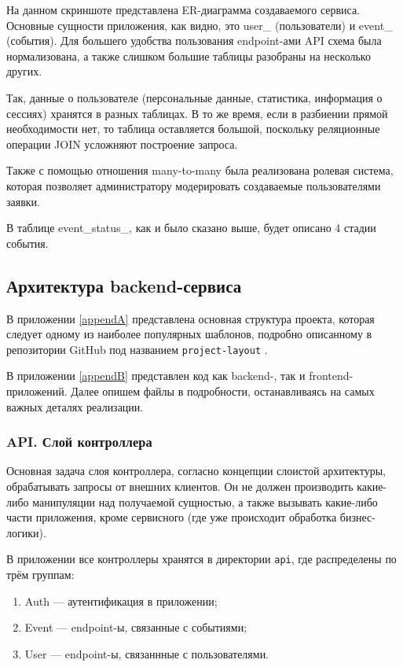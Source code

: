 \documentclass[diploma]{SCWorks}
\begin{document}
На данном скриншоте представлена ER-диаграмма создаваемого сервиса. Основные
сущности приложения, как видно, это user\_ (пользователи) и event\_ (события). 
Для большего удобства пользования endpoint-ами API схема была 
нормализована, а также слишком большие таблицы разобраны на несколько других.

Так, данные о пользователе (персональные данные, статистика, информация о 
сессиях) хранятся в разных таблицах. В то же время, если в разбиении 
прямой необходимости нет, то таблица оставляется
большой, поскольку реляционные операции JOIN усложняют построение запроса.

Также с помощью отношения many-to-many была реализована ролевая система, 
которая позволяет администратору модерировать создаваемые пользователями заявки.

В таблице event\_status\_, как и было сказано выше, будет описано 4 стадии события.

\subsection{Архитектура backend-сервиса}

В приложении \ref{appendA} представлена основная 
структура проекта, которая следует одному из наиболее популярных шаблонов, 
подробно описанному в репозитории GitHub под названием \texttt{project-layout} 
\cite{go-project-layout}.

В приложении \ref{appendB} представлен код как backend-, так и 
frontend-приложений. Далее опишем файлы в подробности, останавливаясь на самых 
важных деталях реализации.

\subsubsection{API. Слой контроллера}

Основная задача слоя контроллера, согласно концепции слоистой архитектуры,
обрабатывать запросы от внешних клиентов. Он не должен производить какие-либо 
манипуляции над получаемой сущностью, а также вызывать какие-либо части 
приложения, кроме сервисного (где уже происходит обработка бизнес-логики).

В приложении все контроллеры хранятся в директории \texttt{api}, где 
распределены по трём группам:
\begin{enumerate}
    \item Auth — аутентификация в приложении;
    \item Event — endpoint-ы, связанные с событиями;
    \item User — endpoint-ы, связаннные с пользователями.
\end{enumerate}
\end{document}
